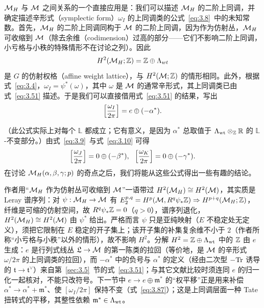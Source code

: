 ${{\mathcal{M}}_H}$ 与 ${\mathcal{M}}$ 之间关系的一个直接应用是：我们可以描述 ${{\mathcal{M}}_H}$ 的二阶上同调，并确定描述辛形式（symplectic form）$\omega_I$ 的上同调类的公式~\eqref{eq:3.8}\ 中的未知常数。首先，${{\mathcal{M}}_H}$ 的二阶上同调同构于 ${\mathcal{M}}$ 的二阶上同调，因为作为仿射丛，${{\mathcal{M}}_H}$ 可收缩到 ${\mathcal{M}}$（除去余维（codimension）过高的部分——它们不影响二阶上同调，小亏格与小秩的特殊情形不在讨论之列）。因此
\setcounter{equation}{74}
\begin{equation}\label{eq:3.75}
  H^2({{\mathcal{M}}_H};{\mathbb{Z}})={\mathbb{Z}}\oplus\Lambda_{wt}
\end{equation}
是 $G$ 的仿射权格（affine weight lattice），与 $H^2({\mathcal{M}};{\mathbb{Z}})$ 的情形相同。此外，根据式~\eqref{eq:3.4}，$\omega_I=\psi^*(\omega)$，其中 $\omega$ 是 ${\mathcal{M}}$ 的通常辛形式，其上同调类已由式~\eqref{eq:3.51} 描述。于是我们可以直接借用式~\eqref{eq:3.51} 的结果，写出
\setcounter{equation}{75}
\begin{equation}\label{eq:3.76}
  \left[{\omega_I\over 2\pi}\right]=e\oplus (-\alpha^*).
\end{equation}

（此公式实际上对每个 $\mathbb{L}$ 都成立；它有意义，是因为 $\alpha^*$ 总取值于 $\Lambda_{\rm wt}\otimes_{\mathbb{Z}}{\mathbb{R}}$ 的 $\mathbb{L}$-不变部分。）由式~\eqref{eq:3.9}\ 与式~\eqref{eq:3.10} 可得
\setcounter{equation}{76}
\begin{equation}\label{eq:3.77}
  \left[{\omega_J\over 2\pi}\right]=0\oplus(-\beta^*),~~\left[{\omega_K\over 2\pi}\right]
=0\oplus(-\gamma^*).
\end{equation}
在讨论 ${{\mathcal{M}}_H}(\alpha,\beta,\gamma;p)$ 的奇点之后，我们将能从这些公式得出一些有趣的结论。

\begin{yizhu}[含糊点拨]
作者用“${{\mathcal{M}}_H}$ 作为仿射丛可收缩到 ${\mathcal{M}}$”一语带过 $H^2({{\mathcal{M}}_H})\cong H^2({\mathcal{M}})$，其实质是 Leray 谱序列：对 $\psi:{{\mathcal{M}}_H}\to{\mathcal{M}}$ 有 $E_2^{p,q}=H^p({\mathcal{M}},R^q\psi_*{\mathbb{Z}})\Rightarrow H^{p+q}({{\mathcal{M}}_H};{\mathbb{Z}})$，纤维是可缩的仿射空间，故 $R^q\psi_*{\mathbb{Z}}=0$（$q>0$），谱序列退化，$H^2({{\mathcal{M}}_H})\cong H^2({\mathcal{M}})$ 由 $\psi^*$ 给出。严格而言 $\psi$ 只是亚纯映射（$E$ 不稳定处无定义），须把它限制在 $E$ 稳定的开子集上；该开子集的补集复余维不小于 $2$（作者所称“小亏格与小秩”以外的情形），故不影响 $H^2$。分解 $H^2={\mathbb{Z}}\oplus\Lambda_{\rm wt}$ 中的 ${\mathbb{Z}}$ 由 $e$ 生成：$e$ 是行列式线丛 $\mathfrak L\to{\mathcal{M}}$ 的第一陈类的拉回（等价地，是 ${\mathcal{M}}$ 的辛形式 $\omega/2\pi$ 的上同调类的拉回），而 $-\alpha^*$ 中的负号与 $\alpha^*$ 的定义（经由二次型 $-{\rm Tr}$ 诱导的 $\mathfrak t\to\mathfrak t^\vee$）来自第~\ref{sec:3.5}~节的式~\eqref{eq:3.51}；与其它文献比较时须连同 $e$ 的归一化一起核对，不能只改符号。下一节中 $e\to e\oplus\mathfrak m^*$ 的“权平移”正是用来补偿 $\alpha^*\to\alpha^*+\mathfrak m^*$、使 $[\omega_I/2\pi]$ 保持不变（式~\eqref{eq:3.87}）；这是上同调层面一种 Tate 扭转式的平移，其整性依赖 $\mathfrak m^*\in\Lambda_{\rm wt}$。
\end{yizhu}


